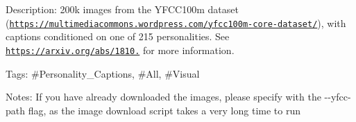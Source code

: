 Description\+: 200k images from the Y\+F\+C\+C100m dataset (\href{https://multimediacommons.wordpress.com/yfcc100m-core-dataset/}{\tt https\+://multimediacommons.\+wordpress.\+com/yfcc100m-\/core-\/dataset/}), with captions conditioned on one of 215 personalities. See \href{https://arxiv.org/abs/1810.10665}{\tt https\+://arxiv.\+org/abs/1810.} for more information.

Tags\+: \#\+Personality\+\_\+\+Captions, \#\+All, \#\+Visual

Notes\+: If you have already downloaded the images, please specify with the {\ttfamily -\/-\/yfcc-\/path} flag, as the image download script takes a very long time to run 